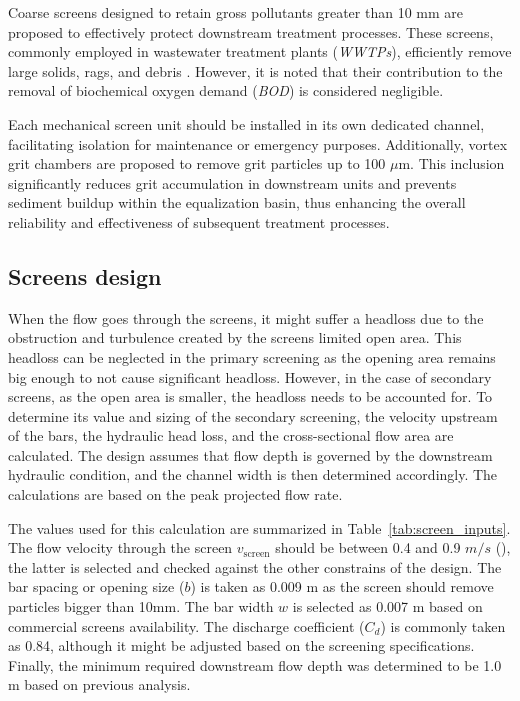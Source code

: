 \documentclass[11pt]{article}
\begin{document}
Coarse screens designed to retain gross pollutants greater than 10 mm are proposed 
to effectively protect downstream treatment processes. These screens, commonly 
employed in wastewater treatment plants (\textit{WWTPs}), efficiently remove large solids, 
rags, and debris \cite{davis2010water}. However, it is noted that their contribution to 
the removal of biochemical oxygen demand (\textit{BOD}) is considered negligible.

Each mechanical screen unit should be installed in its own dedicated channel, 
facilitating isolation for maintenance or emergency purposes. Additionally, 
vortex grit chambers are proposed to remove grit particles up to 100 $\mu$m. 
This inclusion significantly reduces grit accumulation in downstream units 
and prevents sediment buildup within the equalization basin, thus enhancing 
the overall reliability and effectiveness of subsequent treatment processes.

\subsection{Screens design}
\label{sec:screens_design}

When the flow goes through the screens, it might suffer a headloss due to
the obstruction and turbulence created by the screens limited open area.
This headloss can be neglected in the primary screening as the opening area
remains big enough to not cause significant headloss. 
However, in the case of secondary screens, as the open area is 
smaller, the headloss needs to be accounted for.
To determine its value and sizing of the secondary screening, 
the velocity upstream of the bars, 
the hydraulic head loss, and the cross-sectional flow area are calculated. 
The design assumes 
that flow depth is governed by the downstream hydraulic condition, 
and the channel width is then determined accordingly. 
The calculations are based on the peak projected flow rate.


The values used for this calculation are summarized in Table~\ref{tab:screen_inputs}.
The flow velocity through the screen $v_\text{screen}$ should 
be between 0.4 and 0.9 $m/s$ (\cite{davis2010water}), the latter is selected and checked 
against the other constrains of the design. The bar spacing or 
opening size ($b$) 
is taken as 0.009 m as the screen should remove 
particles bigger than 10mm. The bar width $w$ is selected as 
0.007 m based on commercial screens availability. The discharge 
coefficient ($C_d$) is commonly taken as 0.84, although it might be 
adjusted based on the screening specifications. Finally, the minimum 
required downstream flow depth was determined to be 1.0 m based 
on previous analysis.
\end{document}
